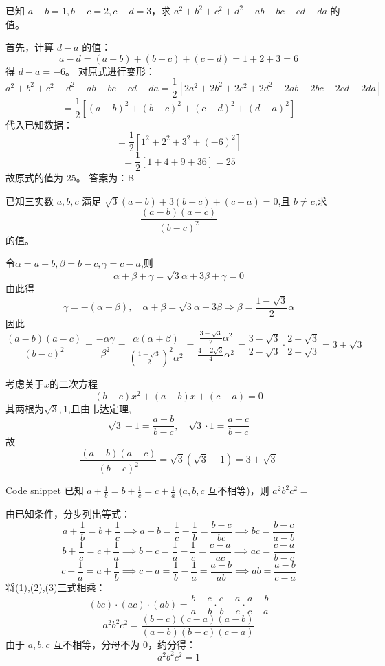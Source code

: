 \begin{questions}
    \question 已知 $a - b = 1, b - c = 2, c - d = 3$，求 $a^2 + b^2 + c^2 + d^2 - ab - bc - cd - da$ 的值。

\begin{solution}
首先，计算 $d - a$ 的值：
\[
a - d = (a - b) + (b - c) + (c - d) = 1 + 2 + 3 = 6
\]
得 $d - a = -6$。
对原式进行变形：
\[
a^2 + b^2 + c^2 + d^2 - ab - bc - cd - da = \frac{1}{2} [2a^2 + 2b^2 + 2c^2 + 2d^2 - 2ab - 2bc - 2cd - 2da]
\]
\[
= \frac{1}{2} [(a - b)^2 + (b - c)^2 + (c - d)^2 + (d - a)^2]
\]
代入已知数据：
\[
= \frac{1}{2} [1^2 + 2^2 + 3^2 + (-6)^2]
\]
\[
= \frac{1}{2} [1 + 4 + 9 + 36] = 25
\]
故原式的值为 25。
答案为：B
\end{solution}

    \question 已知三实数 $a,b,c$ 满足 $\sqrt{3}(a-b)+3(b-c)+(c-a)=0$,且 $b \neq c$,求 
    \[
    \frac{(a-b)(a-c)}{(b-c)^2}
    \]
    的值。
    \begin{solution}
        令$\alpha = a-b, \beta = b-c, \gamma = c-a$,则
        \[
        \alpha+\beta+\gamma= \sqrt{3}\alpha +3\beta +\gamma =0
        \]
        由此得
        \[
        \gamma = -(\alpha+\beta), \quad \alpha+\beta = \sqrt{3}\alpha + 3\beta \Rightarrow \beta = \frac{1-\sqrt{3}}{2}\alpha
        \]
        因此
        \[
        \frac{(a-b)(a-c)}{(b-c)^2} = \frac{-\alpha \gamma}{\beta^2} = \frac{\alpha(\alpha+\beta)}{\left(\frac{1-\sqrt{3}}{2}\right)^2 \alpha^2} = \frac{\frac{3-\sqrt{3}}{2}\alpha^2}{\frac{4-2\sqrt{3}}{4}\alpha^2} = \frac{3-\sqrt{3}}{2-\sqrt{3}} \cdot \frac{2+\sqrt{3}}{2+\sqrt{3}}= 3+\sqrt{3}
        \]
    \end{solution}
    \begin{solution}
        考虑关于$x$的二次方程
        \[
        (b-c)x^2+(a-b)x+(c-a)=0
        \]
        其两根为$\sqrt{3},1$,且由韦达定理,
        \[
        \sqrt{3}+1=\frac{a-b}{b-c},\quad \sqrt{3}\cdot 1=\frac{a-c}{b-c}
        \]
        故
        \[
        \frac{(a-b)(a-c)}{(b-c)^2}=\sqrt{3}(\sqrt{3}+1)=3+\sqrt{3}
        \]
    \end{solution}

    Code snippet
\question
已知 $a + \frac{1}{b} = b + \frac{1}{c} = c + \frac{1}{a}$ ($a, b, c$ 互不相等)，则 $a^2 b^2 c^2 = \underline{\qquad}$

\begin{solution}
由已知条件，分步列出等式：
\[
a + \frac{1}{b} = b + \frac{1}{c} \implies a - b = \frac{1}{c} - \frac{1}{b} = \frac{b - c}{bc} \implies bc = \frac{b - c}{a - b} \tag{1}
\]
\[
b + \frac{1}{c} = c + \frac{1}{a} \implies b - c = \frac{1}{a} - \frac{1}{c} = \frac{c - a}{ac} \implies ac = \frac{c - a}{b - c} \tag{2}
\]
\[
c + \frac{1}{a} = a + \frac{1}{b} \implies c - a = \frac{1}{b} - \frac{1}{a} = \frac{a - b}{ab} \implies ab = \frac{a - b}{c - a} \tag{3}
\]
将(1),(2),(3)三式相乘：
\[
(bc) \cdot (ac) \cdot (ab) = \frac{b - c}{a - b} \cdot \frac{c - a}{b - c} \cdot \frac{a - b}{c - a}
\]
\[
a^2 b^2 c^2 = \frac{(b - c)(c - a)(a - b)}{(a - b)(b - c)(c - a)}
\]
由于 $a, b, c$ 互不相等，分母不为 $0$，约分得：
\[
a^2 b^2 c^2 = 1
\]
\end{solution}


\end{questions}
